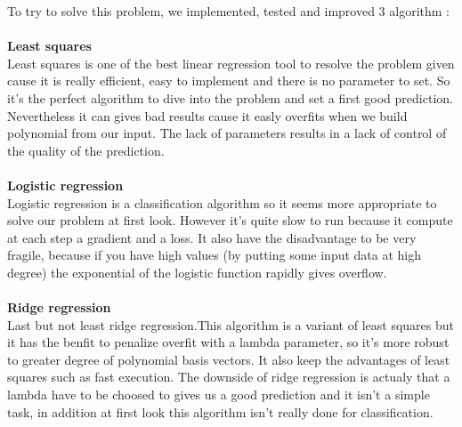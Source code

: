 \documentclass[10pt,conference,compsocconf]{IEEEtran}
\begin{document}
To try to solve this problem, we implemented, tested and improved 3 algorithm :\\ \\
\textbf{Least squares} \\
Least squares is one of the best linear regression tool to resolve the problem given cause it is really efficient, easy to implement and there is no parameter to set. So it's the perfect algorithm to dive into the problem and set a first good prediction. Nevertheless it can gives bad results cause it easly overfits when we build polynomial from our input. The lack of parameters results in a lack of control of the quality of the prediction.\\ \\
\textbf{Logistic regression} \\
 Logistic regression is a classification algorithm so it seems more appropriate to solve our problem at first look. However it's quite slow to run because it compute at each step a gradient and a loss. It also have the disadvantage to be very fragile, because if you have high values (by putting some input data at high degree) the exponential of the logistic function rapidly gives overflow.\\  \\
\textbf{Ridge regression} \\
  Last but not least ridge regression.This algorithm is a variant of least squares but it has the benfit to penalize overfit with a lambda parameter, so it's more robust to greater degree of polynomial basis vectors. It also keep the advantages of least squares such as fast execution. The downside of ridge regression is actualy that a lambda have to be choosed to gives us a good prediction and it isn't a simple task, in addition at first look this algorithm isn't really done for classification.\\ \\
\end{document}
